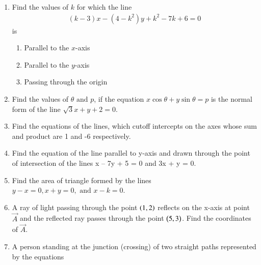 \begin{enumerate}[label=\thesection.\arabic*,ref=\thesection.\theenumi]


\item Find the values of $k$ for which the line 
\begin{align}
(k-3)x-(4-k^2)y+k^2-7k+6=0 \label{eq:chapters/11/10/4/1/1}
\end{align}
is
\begin{enumerate}
\item Parallel to the $x$-axis
\item Parallel to the $y$-axis
\item Passing through the origin
\end{enumerate}
    \solution 
		
	\item Find the values of $\theta \text{ and } p$, if the equation $x\cos\theta+y\sin\theta=p$ is the normal form
of the line $\sqrt{3}x+y+2=0$.
\\
\solution
		
	\item Find the  equations of the lines, which cutoff intercepts on the axes  whose sum and product are 1 and -6 respectively.
\\
\solution
		
	\item  Find the equation of the line parallel to y-axis and drawn through the point of
intersection of the lines x – 7y + 5 = 0 and 3x + y = 0.
\\
\solution
		
	\item Find the area of triangle formed by the lines $y-x=0, x+y=0, \text{ and } x-k=0$.
\solution
		
\item A ray of light passing through the point $\left(1, 2\right)$ reflects on the x-axis at point $\vec{A}$ and the reflected ray passes through the point $\left(5, 3\right)$. Find the coordinates of $\vec{A}$.
\\
    \solution 
		
%		
    \item A person standing at the junction (crossing) of two straight paths 
    represented by the equations 

\end{enumerate}
